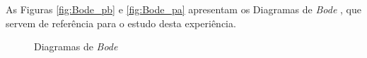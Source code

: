 As Figuras \ref{fig:Bode_pb} e \ref{fig:Bode_pa} apresentam os Diagramas de \textit{Bode} , que servem de referência para o estudo desta experiência. 

\begin{figure}[hbtp]
	\centering%
		\centering
		\qquad
		\caption{Diagramas de \textit{Bode}  \cite{sedrasmith}}%
		\label{fig:Bodeesqgeral}%
	\end{figure}

